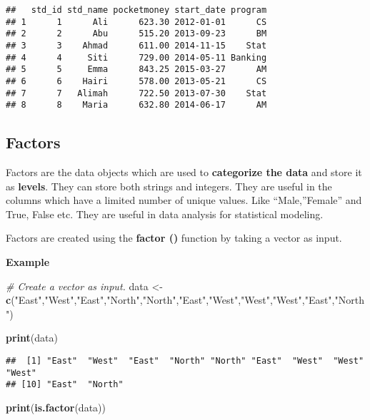 \documentclass[
]{article}
\newenvironment{Shaded}{\begin{snugshade}}{\end{snugshade}}
\newcommand{\CommentTok}[1]{\textcolor[rgb]{0.56,0.35,0.01}{\textit{#1}}}
\newcommand{\FunctionTok}[1]{\textcolor[rgb]{0.13,0.29,0.53}{\textbf{#1}}}
\newcommand{\NormalTok}[1]{#1}
\newcommand{\OtherTok}[1]{\textcolor[rgb]{0.56,0.35,0.01}{#1}}
\newcommand{\StringTok}[1]{\textcolor[rgb]{0.31,0.60,0.02}{#1}}
\begin{document}
\begin{verbatim}
##   std_id std_name pocketmoney start_date program
## 1      1      Ali      623.30 2012-01-01      CS
## 2      2      Abu      515.20 2013-09-23      BM
## 3      3    Ahmad      611.00 2014-11-15    Stat
## 4      4     Siti      729.00 2014-05-11 Banking
## 5      5     Emma      843.25 2015-03-27      AM
## 6      6    Hairi      578.00 2013-05-21      CS
## 7      7   Alimah      722.50 2013-07-30    Stat
## 8      8    Maria      632.80 2014-06-17      AM
\end{verbatim}

\hypertarget{factors}{%
\subsection{Factors}\label{factors}}

Factors are the data objects which are used to \textbf{categorize the
data} and store it as \textbf{levels}. They can store both strings and
integers. They are useful in the columns which have a limited number of
unique values. Like ``Male,''Female'' and True, False etc. They are
useful in data analysis for statistical modeling.

Factors are created using the \textbf{factor ()} function by taking a
vector as input.

\textbf{Example}

\begin{Shaded}
\begin{Highlighting}[]
\CommentTok{\# Create a vector as input.}
\NormalTok{data }\OtherTok{\textless{}{-}} \FunctionTok{c}\NormalTok{(}\StringTok{"East"}\NormalTok{,}\StringTok{"West"}\NormalTok{,}\StringTok{"East"}\NormalTok{,}\StringTok{"North"}\NormalTok{,}\StringTok{"North"}\NormalTok{,}\StringTok{"East"}\NormalTok{,}\StringTok{"West"}\NormalTok{,}\StringTok{"West"}\NormalTok{,}\StringTok{"West"}\NormalTok{,}\StringTok{"East"}\NormalTok{,}\StringTok{"North"}\NormalTok{)}

\FunctionTok{print}\NormalTok{(data)}
\end{Highlighting}
\end{Shaded}

\begin{verbatim}
##  [1] "East"  "West"  "East"  "North" "North" "East"  "West"  "West"  "West" 
## [10] "East"  "North"
\end{verbatim}

\begin{Shaded}
\begin{Highlighting}[]
\FunctionTok{print}\NormalTok{(}\FunctionTok{is.factor}\NormalTok{(data))}
\end{Highlighting}
\end{Shaded}
\end{document}

